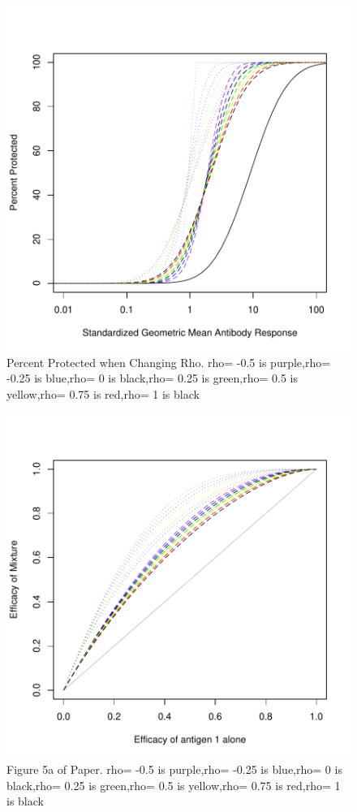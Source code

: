 \documentclass{article}[12pt]
\begin{document}
\begin{figure}
\caption{Percent Protected when Changing Rho.
rho= -0.5  is  purple,rho= -0.25  is  blue,rho= 0  is  black,rho= 0.25  is  green,rho= 0.5  is  yellow,rho= 0.75  is  red,rho= 1  is  black
 \label{fig:logmean.pp.rho} }
\includegraphics{hbimdetails-figLogmeanPPMu}
\end{figure}



\begin{figure}
\caption{Figure 5a of Paper.
rho= -0.5  is  purple,rho= -0.25  is  blue,rho= 0  is  black,rho= 0.25  is  green,rho= 0.5  is  yellow,rho= 0.75  is  red,rho= 1  is  black
 \label{fig:5a} }
\includegraphics{hbimdetails-fig5a}
\end{figure}
\end{document}
